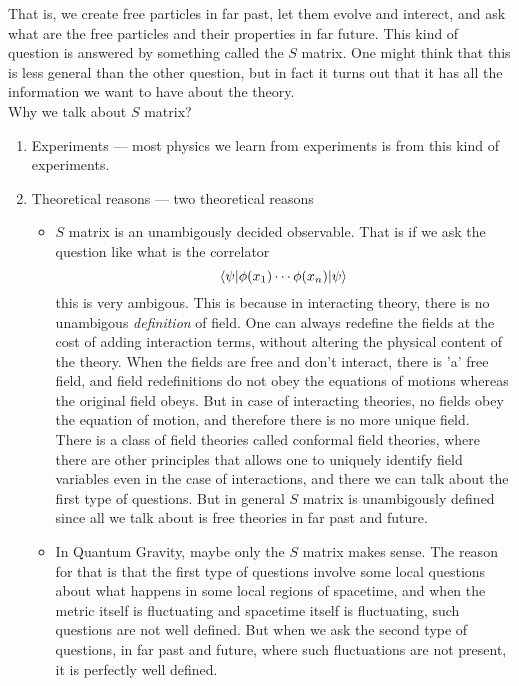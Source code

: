 \documentclass[11pt, notitlepage]{report}
\numberwithin{equation}{section}
\begin{document}
    That is, we create free particles in far past, let them evolve and interect, and ask what are the free particles and their properties in far future. This kind of question is answered by something called the \(S\) matrix. One might think that this is less general than the other question, but in fact it turns out that it has all the information we want to have about the theory. \\

    Why we talk about \(S\) matrix?
    \begin{enumerate}
        \item Experiments — most physics we learn from experiments is from this kind of experiments. 
        \item Theoretical reasons — two theoretical reasons \begin{itemize}
            \item \(S\) matrix is an unambigously decided observable. That is if we ask the question like what is the correlator 
            \begin{equation*}
                \braket{\psi | \phi(x_1) \cdots \phi(x_n)| \psi}
            \end{equation*}
            this is very ambigous. This is because in interacting theory, there is no unambigous \textit{definition} of field. One can always redefine the fields at the cost of adding interaction terms, without altering the physical content of the theory. When the fields are free and don't interact, there is 'a' free field, and field redefinitions do not obey the equations of motions whereas the original field obeys. But in case of interacting theories, no fields obey the equation of motion, and therefore there is no more unique field.\\
            There is a class of field theories called conformal field theories, where there are other principles that allows one to uniquely identify field variables even in the case of interactions, and there we can talk about the first type of questions. But in general \(S\) matrix is unambigously defined since all we talk about is free theories in far past and future.
            \item In Quantum Gravity, maybe only the \(S\) matrix makes sense. The reason for that is that the first type of questions involve some local questions about what happens in some local regions of spacetime, and when the metric itself is fluctuating and spacetime itself is fluctuating, such questions are not well defined. But when we ask the second type of questions, in far past and future, where such fluctuations are not present, it is perfectly well defined. 
        \end{itemize}
    \end{enumerate}
\end{document}
